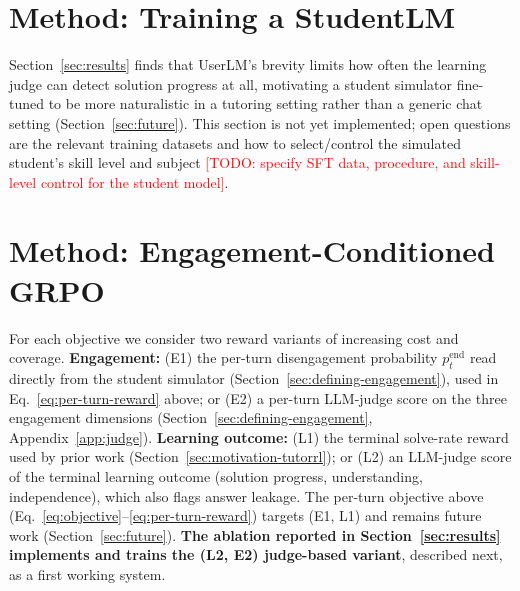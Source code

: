 \documentclass[11pt]{article}
\newcommand{\todo}[1]{\textcolor{red}{[TODO: #1]}}
\begin{document}
\section{Method: Training a StudentLM}
\label{sec:studentlm}

Section~\ref{sec:results} finds that UserLM's brevity limits how often the
learning judge can detect solution progress at all, motivating a student
simulator fine-tuned to be more naturalistic in a tutoring setting rather than
a generic chat setting (Section~\ref{sec:future}). This section is not yet
implemented; open questions are the relevant training datasets and how to
select/control the simulated student's skill level and subject
\todo{specify SFT data, procedure, and skill-level control for the student
model}.

\section{Method: Engagement-Conditioned GRPO}
\label{sec:method}

For each objective we consider two reward variants of increasing cost and
coverage. \textbf{Engagement:} (E1) the per-turn disengagement probability
$p^{\text{end}}_t$ read directly from the student simulator
(Section~\ref{sec:defining-engagement}), used in Eq.~\ref{eq:per-turn-reward}
above; or (E2) a per-turn LLM-judge score on the three engagement dimensions
(Section~\ref{sec:defining-engagement}, Appendix~\ref{app:judge}).
\textbf{Learning outcome:} (L1) the terminal solve-rate reward used by prior
work (Section~\ref{sec:motivation-tutorrl}); or (L2) an LLM-judge score of the
terminal learning outcome (solution progress, understanding, independence),
which also flags answer leakage. The per-turn objective above
(Eq.~\ref{eq:objective}--\ref{eq:per-turn-reward}) targets (E1, L1) and remains
future work (Section~\ref{sec:future}). \textbf{The ablation reported in
Section~\ref{sec:results} implements and trains the (L2, E2) judge-based
variant}, described next, as a first working system.
\end{document}
